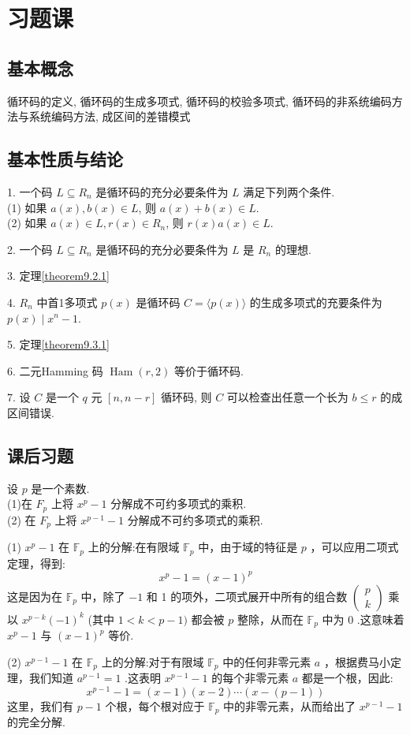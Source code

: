 \section{习题课}

\subsection{基本概念}
循环码的定义, 循环码的生成多项式, 循环码的校验多项式, 循环码的非系统编码方法与系统编码方法, 成区间的差错模式

\subsection{基本性质与结论}

1. 一个码 $ L \subseteq R_{n} $ 是循环码的充分必要条件为 $ L $ 满足下列两个条件.\\
(1) 如果 $ a(x), b(x) \in L $, 则 $ a(x)+b(x) \in L $.\\
(2) 如果 $ a(x) \in L, r(x) \in R_{n} $, 则 $ r(x) a(x) \in L $.

2. 一个码 $ L \subseteq R_{n} $ 是循环码的充分必要条件为 $ L $ 是 $ R_{n} $ 的理想.

3. 定理\ref{theorem9.2.1}

4. $ R_{n} $ 中首1多项式 $ p(x) $ 是循环码 $ C=\langle p(x)\rangle $ 的生成多项式的充要条件为 $ p(x) \mid x^{n}-1 $.

5. 定理\ref{theorem9.3.1}

6. 二元Hamming 码 $ \operatorname{Ham}(r, 2) $ 等价于循环码.

7. 设 $ C $ 是一个 $ q $ 元 $ [n, n-r] $ 循环码, 则 $ C $ 可以检查出任意一个长为 $ b \leq r $ 的成区间错误.

\subsection{课后习题}
\begin{exercise}
     设 $ p $ 是一个素数.\\
(1)在 $ F_{p} $ 上将 $ x^{p}-1 $ 分解成不可约多项式的乘积.\\
(2) 在 $ F_{p} $ 上将 $ x^{p-1}-1 $ 分解成不可约多项式的乘积.
\end{exercise}
\begin{solution}
(1) $ x^{p}-1 $ 在 $ \mathbb{F}_{p} $ 上的分解:在有限域 $ \mathbb{F}_{p} $ 中，由于域的特征是 $ p $ ，可以应用二项式定理，得到:
$$
x^{p}-1=(x-1)^{p}
$$
这是因为在 $ \mathbb{F}_{p} $ 中，除了 $-1$ 和 1 的项外，二项式展开中所有的组合数 $ \left(\begin{array}{l}p \\ k\end{array}\right) $ 乘以 $ x^{p-k}(-1)^{k} $ (其中 $ 1<k<p-1) $ 都会被 $ p $ 整除，从而在 $ \mathbb{F}_{p} $ 中为 0 .这意味着 $ x^{p}-1 $ 与 $ (x-1)^{p} $ 等价.

(2) $ x^{p-1}-1 $ 在 $ \mathbb{F}_{p} $ 上的分解:对于有限域 $ \mathbb{F}_{p} $ 中的任何非零元素 $ a $ ，根据费马小定理，我们知道 $ a^{p-1}=1 $ .这表明 $ x^{p-1}-1 $ 的每个非零元素 $ a $ 都是一个根，因此:
$$
x^{p-1}-1=(x-1)(x-2) \cdots(x-(p-1))
$$
这里，我们有 $ p-1 $ 个根，每个根对应于 $ \mathbb{F}_{p} $ 中的非零元素，从而给出了 $ x^{p-1}-1 $ 的完全分解.
\end{solution}


